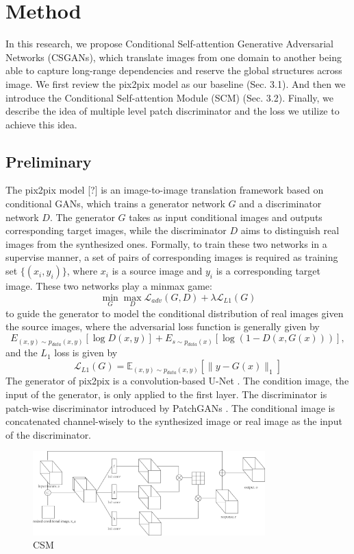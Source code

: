 \section{Method}
In this research, we propose Conditional Self-attention Generative Adversarial Networks (CSGANs), which translate images from one domain to another being able to capture long-range dependencies and reserve the global structures across image. We first review the pix2pix model as our baseline (Sec. 3.1). And then we introduce the Conditional Self-attention Module (SCM) (Sec. 3.2). Finally, we describe the idea of multiple level patch discriminator and the loss we utilize to achieve this idea.
\subsection{Preliminary}
The pix2pix model [?] is an image-to-image translation framework based on conditional GANs, which trains a generator network $G$ and a discriminator network $D$. The generator $G$ takes as input conditional images and outputs corresponding target images, while the discriminator $D$ aims to distinguish real images from the synthesized ones. Formally, to train these two networks in a supervise manner, a set of pairs of corresponding images is required as training set $\{(x_i, y_i)\}$, where $x_i$ is a source image and $y_i$ is a corresponding target image. These two networks play a minmax game:
\begin{equation}
\label{eqn:minmax_game}
\min_G \max_D \mathcal{L}_{adv}(G,D)+\lambda \mathcal{L}_{L1}(G)
\end{equation}
to guide the generator to model the conditional distribution of real images given the source images, where the adversarial loss function is generally given by 
\begin{equation}
\label{eqn:loss_adv}
E_{(x,y)\sim p_{data}(x,y)}[\log D(x,y)]+E_{s\sim p_{data}(x)}[\log(1-D(x,G(x)))],
\end{equation}
and the $L_1$ loss is given by
\begin{equation}
\label{eqn:loss_l1}
\mathcal{L}_{L1}(G)=\mathbb{E}_{(x,y)\sim p_{data}(x,y)}[\|y-G(x)\|_1]
\end{equation}
The generator of pix2pix is a convolution-based U-Net \cite{Unet}. The condition image, the input of the generator, is only applied to the first layer. The discriminator is patch-wise discriminator introduced by PatchGANs \cite{PatchGANs}. The conditional image is concatenated channel-wisely to the synthesized image or real image as the input of the discriminator.
%
%
\begin{figure}
	\label{fig:CSM}
	\includegraphics[width=0.8\textwidth]{figures/CSM}
	\caption{CSM}
\end{figure}
%
%
